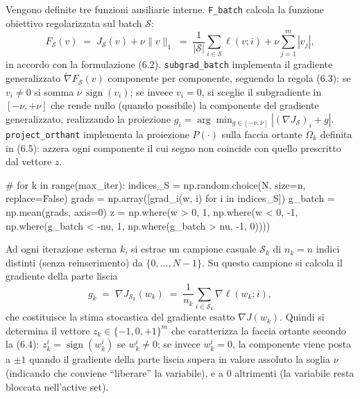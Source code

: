 \documentclass[italian, a4paper, twoside, binding=6mm]{sapthesis}
\begin{document}
Vengono definite tre funzioni ausiliarie interne. \texttt{F\_batch} calcola la funzione obiettivo regolarizzata sul batch $\mathcal{S}$:
\[
F_{\mathcal{S}}(v) \;=\; J_{\mathcal{S}}(v) + \nu\|v\|_1
\;=\; \frac{1}{|\mathcal{S}|}\sum_{i\in\mathcal{S}}\ell(v;i) + \nu\sum_{j=1}^{m}|v_j|,
\]
in accordo con la formulazione (6.2). \texttt{subgrad\_batch} implementa il gradiente generalizzato $\widetilde{\nabla} F_{\mathcal{S}}(v)$ componente per componente, seguendo la regola (6.3): se $v_i\neq 0$ si somma $\nu\,\operatorname{sign}(v_i)$; se invece $v_i=0$, si sceglie il subgradiente in $[-\nu,+\nu]$ che rende nullo (quando possibile) la componente del gradiente generalizzato, realizzando la proiezione $g_i = \arg\min_{g\in[-\nu,\nu]} |(\nabla J_{\mathcal{S}})_i + g|$. \texttt{project\_orthant} implementa la proiezione $P(\cdot)$ sulla faccia ortante $\Omega_k$ definita in (6.5): azzera ogni componente il cui segno non coincide con quello prescritto dal vettore $z$.

\begin{pythoncode}[title= Newton-L1]

#
    for k in range(max_iter):
        indices_S = np.random.choice(N, size=n, replace=False)
        grads = np.array([grad_i(w, i) for i in indices_S])
        g_batch = np.mean(grads, axis=0)
        z = np.where(w > 0, 1,
            np.where(w < 0, -1,
                np.where(g_batch < -nu, 1,
                    np.where(g_batch > nu, -1, 0))))
\end{pythoncode}
Ad ogni iterazione esterna $k$, si estrae un campione casuale $\mathcal{S}_k$ di $n_k=n$ indici distinti (senza reinserimento) da $\{0,\dots,N-1\}$. Su questo campione si calcola il gradiente della parte liscia
\[
g_k \;=\; \nabla J_{\mathcal{S}_k}(w_k) \;=\; \frac{1}{n_k}\sum_{i\in\mathcal{S}_k}\nabla\ell(w_k;i),
\]
che costituisce la stima stocastica del gradiente esatto $\nabla J(w_k)$. Quindi si determina il vettore $z_k\in\{-1,0,+1\}^m$ che caratterizza la faccia ortante secondo la (6.4): $z_k^i=\operatorname{sign}(w_k^i)$ se $w_k^i\neq 0$; se invece $w_k^i=0$, la componente viene posta a $\pm 1$ quando il gradiente della parte liscia supera in valore assoluto la soglia $\nu$ (indicando che conviene ``liberare'' la variabile), e a $0$ altrimenti (la variabile resta bloccata nell'active set).
\end{document}
